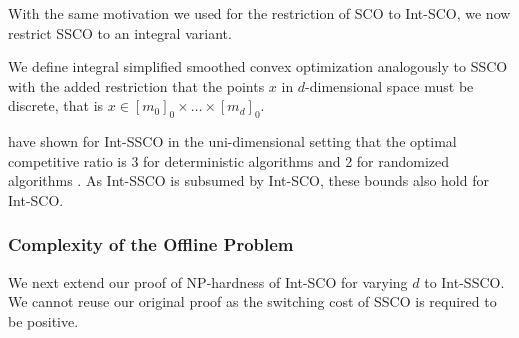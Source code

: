 With the same motivation we used for the restriction of SCO to Int-SCO, we now restrict SSCO to an integral variant.

\begin{problem}
We define integral simplified smoothed convex optimization analogously to SSCO with the added restriction that the points $x$ in $d$-dimensional space must be discrete, that is $x \in [m_0]_0 \times \dots \times [m_d]_0$.
\end{problem}

\citeauthor*{Albers2018} have shown for Int-SSCO in the uni-dimensional setting that the optimal competitive ratio is 3 for deterministic algorithms and 2 for randomized algorithms \cite{Albers2018}. As Int-SSCO is subsumed by Int-SCO, these bounds also hold for Int-SCO.

\subsubsection{Complexity of the Offline Problem}

We next extend our proof of NP-hardness of Int-SCO for varying $d$ to Int-SSCO. We cannot reuse our original proof as the switching cost of SSCO is required to be positive.

